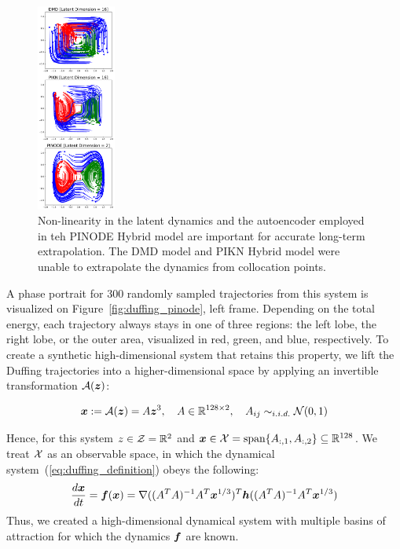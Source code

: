 \begin{figure}
  \begin{center}
    \includegraphics[width=0.23\textwidth]{figures/duffing_comparison.pdf}
  \end{center}
  \caption{Non-linearity in the latent dynamics and the autoencoder employed in teh PINODE Hybrid model are important for accurate long-term extrapolation. The DMD model and PIKN Hybrid model were unable to extrapolate the dynamics from collocation points.}%
  \label{fig:duffing_comparison}
\end{figure}
A phase portrait for 300 randomly sampled trajectories from this system is visualized on Figure~\ref{fig:duffing_pinode}, left frame. Depending on the total energy, each trajectory always stays in one of three regions: the left lobe, the right lobe, or the outer area, visualized in red, green, and blue, respectively. To create a synthetic high-dimensional system that retains this property, we lift the Duffing trajectories into a higher-dimensional space by applying an invertible transformation $\mathcal{A}(\boldsymbol{z})$: 

\begin{equation}
    \label{eq:duffing_true_decoder}
    \boldsymbol{x} := \mathcal{A}(\boldsymbol{z}) = A\boldsymbol{z}^3, \quad A \in \mathbb{R}^{128 \times 2}, \quad A_{ij} \sim_{i.i.d.} \mathcal{N}(0, 1)
\end{equation}


Hence, for this system $z \in \operatorname{\mathcal{Z}} = \mathbb{R}^2$ and $\boldsymbol{x} \in \operatorname{\mathcal{X}} = \text{span}\{A_{:,1}, A_{:,2}\} \subseteq \mathbb{R}^{128}$. We treat $\operatorname{\mathcal{X}}$ as an observable space, in which the dynamical system~(\ref{eq:duffing_definition}) obeys the following:
\begin{equation}
    \frac{d\boldsymbol{x}}{dt} = \boldsymbol{f}(\boldsymbol{x}) = \nabla((A^TA)^{-1}A^T\boldsymbol{x}^{1/3})^T\boldsymbol{h}((A^TA)^{-1}A^T\boldsymbol{x}^{1/3})
\end{equation}
Thus, we created a high-dimensional dynamical system with multiple basins of attraction for which the dynamics $\boldsymbol{f}$ are known.


